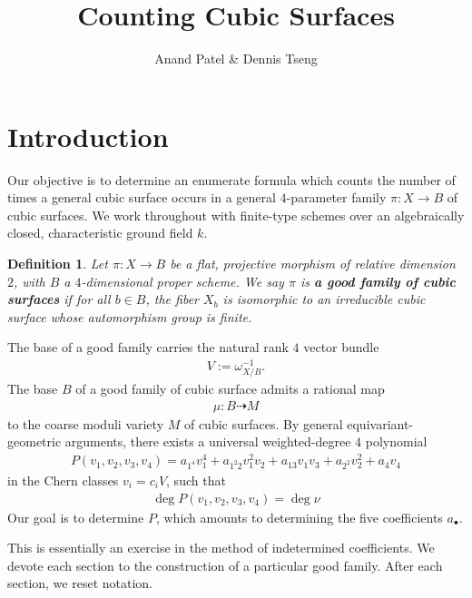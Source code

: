 \documentclass{article}
\title{Counting Cubic Surfaces}
\author{Anand Patel \& Dennis Tseng}
\newtheorem{definition}{Definition}[section]
\newcommand{\<}{\left\langle}
\renewcommand{\>}{\right\rangle}
\begin{document}
\maketitle


\section{Introduction}
\label{sec:intro}
Our objective is to determine an enumerate formula which counts the
number of times a general cubic surface occurs in a general
$4$-parameter family $ \pi: X \to B$ of cubic surfaces.  We work
throughout with finite-type schemes over an algebraically closed,
characteristic ground field $k$.

\begin{definition}
  Let $\pi :X \to B$ be a flat, projective morphism of relative
  dimension $2$, with $B$ a $4$-dimensional proper scheme. We say
  $\pi$ is  {\bf a good family of cubic surfaces} if for all
  $b \in B$, the fiber $X_{b}$ is isomorphic to an irreducible cubic
  surface whose automorphism group is finite.
\end{definition}

The base of a good family carries the natural rank $4$
vector bundle
\begin{align}
  \label{eq:V}
  V := \omega_{X/B}^{-1}.
\end{align}
The base $B$ of a good family of cubic surface admits a rational map
\begin{align}
  \label{eq:mu}
  \mu: B \dashrightarrow M
\end{align}
to the coarse moduli variety $M$ of cubic surfaces.  By general
equivariant-geometric arguments, there exists a universal
weighted-degree $4$ polynomial
\begin{align}
  \label{eq:P}
  P(v_1,v_2,v_3,v_4) = a_{1^4}v_{1}^{4} + a_{1^{2}2}v_{1}^{2}v_{2} + a_{13}v_{1}v_{3} + a_{2^2}v_{2}^{2} + a_{4}v_{4}
\end{align}
in the Chern classes $v_{i} = c_{i}V$, such that
\begin{align}
  \label{eq:equality}
  \deg P(v_{1},v_{2},v_{3},v_{4}) = \deg \nu
  \end{align}
Our goal is to determine $P$, which amounts to determining
the five coefficients $a_{\bullet}$.

This is essentially an exercise in the method of indetermined
coefficients. We devote each section to the construction of a
particular good family.  After each section, we reset notation.
\end{document}
